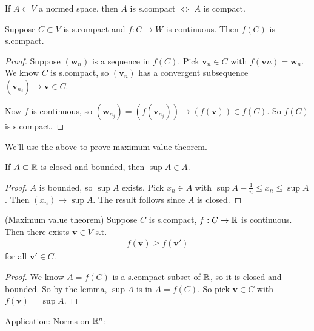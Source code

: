 \documentclass[a4paper]{article}
\begin{document}
\begin{rem} If $A \subset V$ a normed space, then $A$ is s.compact $\iff$ $A$ is compact.
\end{rem}

\begin{prop}
Suppose $C \subset V$ is s.compact and $f:C\to W$ is continuous. Then $f\left(C\right)$ is s.compact.
\begin{proof}
Suppose $\left(\mathbf{w}_n\right)$ is a sequence in $f\left(C\right)$. Pick $\mathbf{v}_n \in C$ with $f\left(\mathbf{v}n\right) = \mathbf{w}_n$. We know $C$ is s.compact, so $\left(\mathbf{v}_n\right)$ has a convergent subsequence $\left(\mathbf{v}_{n_j}\right) \to \mathbf{v} \in C$.

Now $f$ is continuous, so $\left(\mathbf{w}_{n_j}\right) = \left(f\left(\mathbf{v}_{n_j}\right)\right) \to \left(f\left(\mathbf{v}\right)\right) \in f\left(C\right)$. So $f\left(C\right)$ is s.compact.
\end{proof}
\end{prop}

We'll use the above to prove maximum value theorem.

\begin{lemma}
If $A \subset \mathbb{R}$ is closed and bounded, then $\sup A\in A$.
\begin{proof}
$A$ is bounded, so $\sup A$ exists. Pick $x_n \in A$ with $\sup A - \frac{1}{n} \leq x_n \leq \sup A$. Then $\left(x_n\right) \to \sup A$. The result follows since $A$ is closed.
\end{proof}
\end{lemma}

\begin{thm} (Maximum value theorem) Suppose $C$ is s.compact, $f:C\to \mathbb{R}$ is continuous. Then there exists $\mathbf{v} \in V$ s.t.
\begin{equation*}
\begin{aligned}
f\left(\mathbf{v}\right) \geq f\left(\mathbf{v'}\right)
\end{aligned}
\end{equation*}
for all $\mathbf{v'} \in C$.
\begin{proof}
We know $A = f\left(C\right)$ is a s.compact subset of $\mathbb{R}$, so it is closed and bounded. So by the lemma, $\sup A$ is in $A = f\left(C\right)$. So pick $\mathbf{v}\in C$ with $f\left(\mathbf{v}\right) = \sup A$.
\end{proof}
\end{thm}

Application: Norms on $\mathbb{R}^n$:
\end{document}

